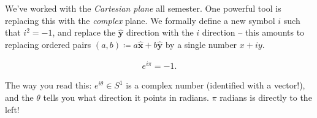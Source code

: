 \begin{remark}

We've worked with the \emph{Cartesian plane} all semester. One powerful
tool is replacing this with the \emph{complex} plane. We formally define
a new symbol \(i\) such that \(i^2 = -1\), and replace the
\(\widehat{ \mathbf{y} }\) direction with the \(i\) direction -- this
amounts to replacing ordered pairs
\((a, b) \coloneqq a \widehat{ \mathbf{x} } + b\widehat{ \mathbf{y} }\)
by a single number \(x + iy\).

\end{remark}

\begin{proposition}

\begin{align*}
e^{i\pi} = -1
.\end{align*}

\end{proposition}

\begin{remark}

The way you read this: \(e^{i\theta} \in S^1\) is a complex number
(identified with a vector!), and the \(\theta\) tells you what direction
it points in radians. \(\pi\) radians is directly to the left!

\end{remark}

\cleardoublepage

\renewcommand{\listtheoremname}{}
\listoftheorems[ignoreall,show={definition}, numwidth=3.5em]
\cleardoublepage

\renewcommand{\listtheoremname}{}
\listoftheorems[ignoreall,show={theorem,proposition}, numwidth=3.5em]
\cleardoublepage

\renewcommand{\listtheoremname}{}
\listoftheorems[ignoreall,show={exercise}, numwidth=3.5em]
\cleardoublepage

\listoffigures
\cleardoublepage


\printbibliography[title=Bibliography]



